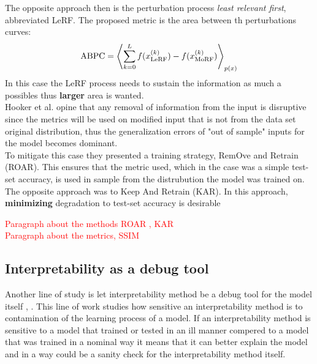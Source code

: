 \documentclass[12pt]{report}
\begin{document}
The opposite approach then is the perturbation process \textit{least relevant first}, abbreviated LeRF. The proposed metric is the area between th perturbations curves:
\begin{align*}
	\text{ABPC} = \Braket{	\sum_{k=0}^{L}f(x_{\text{LeRF}}^{(k)}) -f(x_{\text{MoRF}}^{(k)})}_{p(x)}
\end{align*}
In this case the LeRF process needs to sustain the information as much a possibles thus \textbf{larger} area is wanted.\\

Hooker et al.  \cite{https://doi.org/10.48550/arxiv.1806.10758} opine that any removal of information from the input is disruptive since the metrics will be used on modified input that is not from the data set original distribution, thus the generalization errors of "out of sample" inputs for the model becomes dominant. \\

To mitigate this case they presented a training strategy, RemOve and Retrain (ROAR). This ensures that the metric used, which in the case was a simple test-set accuracy, is used in sample from the distrubution the model was trained on. The opposite approach was to Keep And Retrain (KAR). In this approach, \textbf{minimizing} degradation to test-set accuracy is desirable






\textcolor{red}{Paragraph about the methods ROAR , KAR} \\


\textcolor{red}{Paragraph about the metrics, SSIM} \\

\subsection{Interpretability as a debug tool}
Another line of study is let interpretability method be a debug tool for the model itself \cite{https://doi.org/10.48550/arxiv.1810.03292}, \cite{DBLP:journals/corr/abs-2011-05429}. This line of work studies how sensitive an interpretability method is to contamination of the learning process of a model. If an interpretability method is sensitive to a model that trained or tested in an ill manner compered to a model that was trained in a nominal way it means that it can better explain the model and in a way could be a sanity check for the interpretability method itself.  \\
\end{document}

